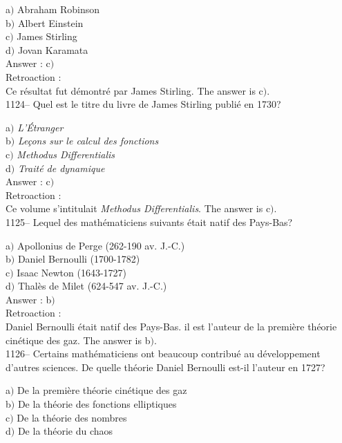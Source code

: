 ﻿\documentclass[letterpaper, 12pt]{article}
\begin{document}
a$)$ Abraham Robinson \\
b$)$ Albert Einstein \\
c$)$ James Stirling  \\
d$)$ Jovan Karamata\\

Answer : c$)$\\

Retroaction : \\
Ce r\'esultat fut d\'emontr\'e par James Stirling.
The answer is c$)$.\\

1124-- Quel est le titre du livre de James Stirling publi\'e en
1730?

a$)$ {\sl L'\'Etranger} \\
b$)$ {\sl Le\c cons sur le calcul des fonctions}  \\
c$)$ {\sl Methodus Differentialis}  \\
d$)$ {\sl Trait\'e de dynamique} \\

Answer : c$)$\\

Retroaction : \\
Ce volume s'intitulait {\sl Methodus Differentialis}.
The answer is c$)$.\\

1125-- Lequel des math\'ematiciens suivants \'etait natif des
Pays-Bas?

a$)$ Apollonius de Perge (262-190 av. J.-C.) \\
b$)$ Daniel Bernoulli (1700-1782) \\
c$)$ Isaac Newton (1643-1727) \\
d$)$ Thal\`es de Milet (624-547 av. J.-C.)\\

Answer : b$)$\\

Retroaction : \\
Daniel Bernoulli \'etait natif des Pays-Bas. il est l'auteur de la
premi\`ere th\'eorie cin\'etique des gaz.
The answer is b$)$.\\

1126-- Certains math\'ematiciens ont beaucoup contribu\'e au
d\'eveloppement d'autres sciences. De quelle th\'eorie Daniel
Bernoulli est-il l'auteur en 1727?

a$)$ De la premi\`ere th\'eorie cin\'etique des gaz \\
b$)$ De la th\'eorie des fonctions elliptiques \\
c$)$ De la th\'eorie des nombres \\
d$)$ De la th\'eorie du chaos\\
\end{document}
